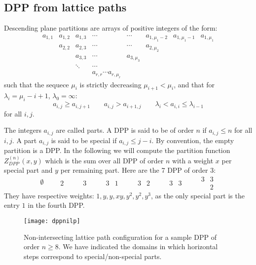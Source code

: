 \documentclass[12pt]{amsart}
\numberwithin{equation}{section}
\begin{document}
\subsection{DPP from lattice paths}

Descending plane partitions are arrays of positive integers of the form:
$$\begin{matrix} a_{1,1} & a_{1,2} & a_{1,3} & \cdots & \cdots & a_{1,\mu_1-2} & a_{1,\mu_1-1} & a_{1,\mu_1} \\
 & a_{2,2} & a_{2,3} & \cdots & \cdots & a_{2,\mu_2} & & \\
 & & a_{3,3} & \cdots & a_{3,\mu_3} & & & \\
 & & \ddots & \cdots & & & & \\
 & & & a_{r,r}\cdots a_{r,\mu_r} & & & &
\end{matrix}$$
such that the sequece $\mu_i$ is strictly decreasing $\mu_{i+1}<\mu_i$, and that for $\lambda_i=\mu_i-i+1$,
$\lambda_0=\infty$:
$$  a_{i,j}\geq a_{i,j+1} \qquad a_{i,j}>a_{i+1,j} \qquad \lambda_i<a_{i,i}\leq \lambda_{i-1} $$
for all $i,j$.

The integers $a_{i,j}$ are called parts. A DPP is said to be of order $n$ if $a_{i,j}\leq n$ for all $i,j$. A part
$a_{i,j}$ is said to be special if $a_{i,j}\leq j-i$. By convention, the empty partition is a DPP.
In the following we will compute the partition function
$Z_{DPP}^{(n)}(x,y)$ which is the sum over all DPP of order $n$ with a weight $x$ per special part 
and $y$ per remaining part. Here are the 7 DPP of order 3:
$$\emptyset\qquad \begin{matrix} 2 \end{matrix}\qquad \begin{matrix} 3 \end{matrix} \qquad 
\begin{matrix} 3 & 1 \end{matrix}\qquad 
\begin{matrix} 3 & 2\end{matrix}\qquad \begin{matrix} 3 & 3\end{matrix}\qquad \begin{matrix} 3 & 3\\ & 2\end{matrix}$$
They have respective weights: $1,y,y,xy,y^2,y^2,y^3$, as the only special part is the entry $1$ in the fourth DPP.

\begin{figure}
\centering
\texttt{[image: dppnilp]}
\caption{\small Non-intersecting lattice path configuration for a sample DPP of order $n\geq 8$.
We have indicated the domains in which horizontal steps correspond to special/non-special parts.}
\label{fig:dppnilp}
\end{figure}
\end{document}
